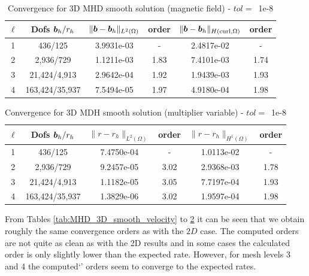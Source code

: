 \begin{table}[h!]
\begin{center}
\begin{tabular}{cccccc}
\hline
$\ell$ &    Dofs $\boldsymbol b_h/r_h$ & $\|\boldsymbol b-\boldsymbol b_h\|_{L^2(\Omega)}$ & order & $\|\boldsymbol b-\boldsymbol b_h\|_{H({\rm curl},\Omega)}$ & order \\
\hline
1 &     436/125 &  3.9931e-03 &     - &  2.4817e-02 &        - \\
2 &    2,936/729 &  1.1211e-03 &     1.83 &  7.4101e-03 &        1.74 \\
3 &   21,424/4,913 &  2.9642e-04 &     1.92 &  1.9439e-03 &        1.93 \\
4 &  163,424/35,937 &  7.5494e-05 &     1.97 &  4.9180e-04 &        1.98 \\
\hline
\end{tabular}
\caption{Convergence for 3D MHD smooth solution (magnetic field) - $tol=$~1e-8}
\label{tab:MHD_3D_smooth_magnetic}
\end{center}
\end{table}



\begin{table}[h!]
\begin{center}
\begin{tabular}{cccccc}
\hline
$\ell$ &    Dofs $\boldsymbol b_h/r_h$ & $\|{r}-{r}_h\|_{L^2(\Omega)}$ & order & $\|{r}-{r}_h\|_{H^1(\Omega)}$ & order\\
\hline
 1 &     436/125 &       7.4750e-04 &     - &  1.0113e-02 &     - \\
 2 &    2,936/729 &      9.2457e-05 &     3.02 &  2.9368e-03 &     1.78 \\
 3 &   21,424/4,913 &         1.1182e-05 &     3.05 &  7.7197e-04 &     1.93 \\
 4 &  163,424/35,937 &       1.3829e-06 &     3.02 &  1.9597e-04 &     1.98 \\
\hline
\end{tabular}
\caption{Convergence for 3D MDH smooth solution (multiplier variable) - $tol=$~1e-8}
\label{tab:MHD_3D_smooth_multiplier}
\end{center}
\end{table}

From Tables \ref{tab:MHD_3D_smooth_velocity} to \ref{tab:MHD_3D_smooth_multiplier} it can be seen that we obtain roughly the same convergence orders as with the $2D$ case. The computed orders are not quite as clean as with the 2D results and in some cases the calculated order is only slightly lower than the expected rate. However, for mesh levels 3 and 4 the computed`' orders seem to converge to the expected rates.


